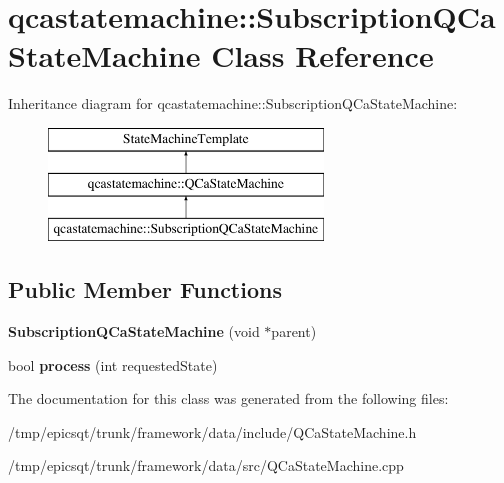 \hypertarget{classqcastatemachine_1_1SubscriptionQCaStateMachine}{
\section{qcastatemachine::SubscriptionQCaStateMachine Class Reference}
\label{classqcastatemachine_1_1SubscriptionQCaStateMachine}
}
Inheritance diagram for qcastatemachine::SubscriptionQCaStateMachine:\begin{figure}[H]
\begin{center}
\leavevmode
\includegraphics[height=3.000000cm]{classqcastatemachine_1_1SubscriptionQCaStateMachine}
\end{center}
\end{figure}
\subsection*{Public Member Functions}
\begin{DoxyCompactItemize}
\item 
\hypertarget{classqcastatemachine_1_1SubscriptionQCaStateMachine_aeee1ac0c5a134aee7e914e1d63909309}{
{\bfseries SubscriptionQCaStateMachine} (void $\ast$parent)}
\label{classqcastatemachine_1_1SubscriptionQCaStateMachine_aeee1ac0c5a134aee7e914e1d63909309}

\item 
\hypertarget{classqcastatemachine_1_1SubscriptionQCaStateMachine_a68b4368673c83ef0c8e224c177dceeaf}{
bool {\bfseries process} (int requestedState)}
\label{classqcastatemachine_1_1SubscriptionQCaStateMachine_a68b4368673c83ef0c8e224c177dceeaf}

\end{DoxyCompactItemize}


The documentation for this class was generated from the following files:\begin{DoxyCompactItemize}
\item 
/tmp/epicsqt/trunk/framework/data/include/QCaStateMachine.h\item 
/tmp/epicsqt/trunk/framework/data/src/QCaStateMachine.cpp\end{DoxyCompactItemize}
